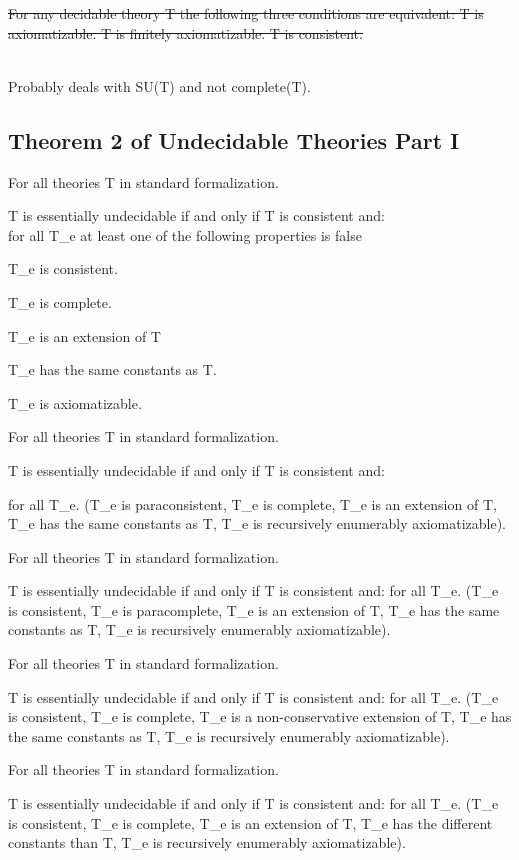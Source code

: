 \st{For any decidable theory T the following three conditions are
equivalent: T is axiomatizable. T is finitely axiomatizable. T is
consistent.}\\
\strut \\
Probably deals with SU(T) and not complete(T).

\hypertarget{theorem-2-of-undecidable-theories-part-i}{%
\subsection{Theorem 2 of Undecidable Theories Part
I}\label{theorem-2-of-undecidable-theories-part-i}}

For all theories T in standard formalization.

T is essentially undecidable if and only if T is consistent and:\\
for all T\_e at least one of the following properties is false

T\_e is consistent.

T\_e is complete.

T\_e is an extension of T

T\_e has the same constants as T.

T\_e is axiomatizable.

For all theories T in standard formalization.

T is essentially undecidable if and only if T is consistent and:

for all T\_e. (T\_e is paraconsistent, T\_e is complete, T\_e is an
extension of T, T\_e has the same constants as T, T\_e is recursively
enumerably axiomatizable).

For all theories T in standard formalization.

T is essentially undecidable if and only if T is consistent and: for all
T\_e. (T\_e is consistent, T\_e is paracomplete, T\_e is an extension of
T, T\_e has the same constants as T, T\_e is recursively enumerably
axiomatizable).

For all theories T in standard formalization.

T is essentially undecidable if and only if T is consistent and: for all
T\_e. (T\_e is consistent, T\_e is complete, T\_e is a non-conservative
extension of T, T\_e has the same constants as T, T\_e is recursively
enumerably axiomatizable).

For all theories T in standard formalization.

T is essentially undecidable if and only if T is consistent and: for all
T\_e. (T\_e is consistent, T\_e is complete, T\_e is an extension of T,
T\_e has the different constants than T, T\_e is recursively enumerably
axiomatizable).

